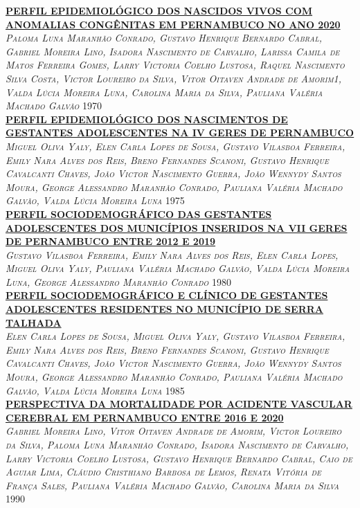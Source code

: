 \noindent \textsc{\hyperlink{trabalhos/250130.pdf.1}{\textbf{PERFIL EPIDEMIOLÓGICO DOS NASCIDOS VIVOS COM ANOMALIAS CONGÊNITAS EM PERNAMBUCO NO ANO 2020}}}\\ 
\noindent \textsc{\textit{Paloma Luna Maranhão Conrado, Gustavo Henrique Bernardo Cabral, Gabriel Moreira Lino, Isadora Nascimento de Carvalho, Larissa Camila de Matos Ferreira Gomes, Larry Victoria Coelho Lustosa, Raquel Nascimento Silva Costa, Victor Loureiro da Silva, Vitor Oitaven Andrade de Amorim1, Valda Lúcia Moreira Luna, Carolina Maria da Silva, Pauliana Valéria Machado Galvão}} \hfill 1970\\ 

\noindent \textsc{\hyperlink{trabalhos/251805.pdf.1}{\textbf{PERFIL EPIDEMIOLÓGICO DOS NASCIMENTOS DE GESTANTES ADOLESCENTES NA IV GERES DE PERNAMBUCO}}}\\ 
\noindent \textsc{\textit{Miguel Oliva Yaly, Elen Carla Lopes de Sousa, Gustavo Vilasboa Ferreira, Emily Nara Alves dos Reis, Breno Fernandes Scanoni, Gustavo Henrique Cavalcanti Chaves, João Victor Nascimento Guerra, João Wennydy Santos Moura, George Alessandro Maranhão Conrado, Pauliana Valéria Machado Galvão, Valda Lúcia Moreira Luna}} \hfill 1975\\ 

\noindent \textsc{\hyperlink{trabalhos/251564.pdf.1}{\textbf{PERFIL SOCIODEMOGRÁFICO DAS GESTANTES ADOLESCENTES DOS MUNICÍPIOS INSERIDOS NA VII GERES DE PERNAMBUCO ENTRE 2012 E 2019}}}\\ 
\noindent \textsc{\textit{Gustavo Vilasboa Ferreira, Emily Nara Alves dos Reis, Elen Carla Lopes, Miguel Oliva Yaly, Pauliana Valéria Machado Galvão, Valda Lúcia Moreira Luna, George Alessandro Maranhão Conrado}} \hfill 1980\\ 

\noindent \textsc{\hyperlink{trabalhos/251836.pdf.1}{\textbf{PERFIL SOCIODEMOGRÁFICO E CLÍNICO DE GESTANTES ADOLESCENTES RESIDENTES NO MUNICÍPIO DE SERRA TALHADA}}}\\ 
\noindent \textsc{\textit{Elen Carla Lopes de Sousa, Miguel Oliva Yaly, Gustavo Vilasboa Ferreira, Emily Nara Alves dos Reis, Breno Fernandes Scanoni, Gustavo Henrique Cavalcanti Chaves, João Victor Nascimento Guerra, João Wennydy Santos Moura, George Alessandro Maranhão Conrado, Pauliana Valéria Machado Galvão, Valda Lúcia Moreira Luna}} \hfill 1985\\ 

\noindent \textsc{\hyperlink{trabalhos/250488.pdf.1}{\textbf{PERSPECTIVA DA MORTALIDADE POR ACIDENTE VASCULAR CEREBRAL EM PERNAMBUCO ENTRE 2016 E 2020}}}\\ 
\noindent \textsc{\textit{Gabriel Moreira Lino, Vitor Oitaven Andrade de Amorim, Victor Loureiro da Silva, Paloma Luna Maranhão Conrado, Isadora Nascimento de Carvalho, Larry Victoria Coelho Lustosa, Gustavo Henrique Bernardo Cabral, Caio de Aguiar Lima, Cláudio Cristhiano Barbosa de Lemos, Renata Vitória de França Sales, Pauliana Valéria Machado Galvão, Carolina Maria da Silva}} \hfill 1990\\ 

